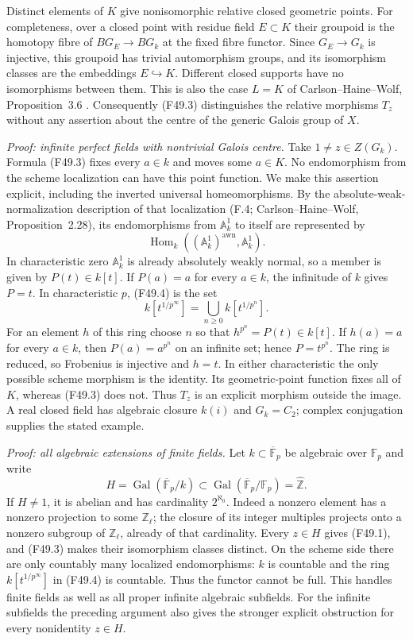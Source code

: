 Distinct elements of $K$ give nonisomorphic relative closed geometric
points. For completeness, over a closed point with residue field
$E\subset K$ their groupoid is the homotopy fibre of
$B G_E\to B G_k$ at the fixed fibre functor. Since $G_E\to G_k$
is injective, this groupoid has trivial automorphism groups, and its
isomorphism classes are the embeddings $E\hookrightarrow K$.
Different closed supports have no isomorphisms between them.
This is also the case $L=K$ of Carlson--Haine--Wolf,
Proposition~3.6 \citep{CHW2024}. Consequently (F49.3) distinguishes
the relative morphisms $T_z$ without any assertion about the centre
of the generic Galois group of $X$.

\emph{Proof: infinite perfect fields with nontrivial Galois centre.}
Take $1\ne z\in Z(G_k)$. Formula (F49.3) fixes every $a\in k$
and moves some $a\in K$. No endomorphism from the scheme
localization can have this point function. We make this assertion
explicit, including the inverted universal homeomorphisms.
By the absolute-weak-normalization description of that localization
(F.4; Carlson--Haine--Wolf, Proposition~2.28), its endomorphisms
from $\mathbb A^1_k$ to itself are represented by
\[
 \operatorname{Hom}_k((\mathbb A^1_k)^{\mathrm{awn}},\mathbb A^1_k).
                                                               \tag{F49.4}
\]
In characteristic zero $\mathbb A^1_k$ is already absolutely weakly
normal, so a member is given by $P(t)\in k[t]$. If $P(a)=a$ for
every $a\in k$, the infinitude of $k$ gives $P=t$.
In characteristic $p$, (F49.4) is the set
\[
                  k[t^{1/p^\infty}]
                    =\bigcup_{n\geq0}k[t^{1/p^n}].
\]
For an element $h$ of this ring choose $n$ so that
$h^{p^n}=P(t)\in k[t]$. If $h(a)=a$ for every $a\in k$, then
$P(a)=a^{p^n}$ on an infinite set; hence $P=t^{p^n}$.
The ring is reduced, so Frobenius is injective and $h=t$.
In either characteristic the only possible scheme morphism is the
identity. Its geometric-point function fixes all of $K$, whereas
(F49.3) does not. Thus $T_z$ is an explicit morphism outside the
image. A real closed field has algebraic closure $k(i)$ and
$G_k=C_2$; complex conjugation supplies the stated example.

\emph{Proof: all algebraic extensions of finite fields.}
Let $k\subset\overline{\mathbb F}_p$ be algebraic over
$\mathbb F_p$ and write
\[
 H=\operatorname{Gal}(\overline{\mathbb F}_p/k)
       \subset\operatorname{Gal}(\overline{\mathbb F}_p/\mathbb F_p)
       =\widehat{\mathbb Z}.
\]
If $H\ne1$, it is abelian and has cardinality $2^{\aleph_0}$.
Indeed a nonzero element has a nonzero projection to some
$\mathbb Z_\ell$; the closure of its integer multiples projects
onto a nonzero subgroup of $\mathbb Z_\ell$, already of that
cardinality. Every $z\in H$ gives (F49.1), and (F49.3) makes
their isomorphism classes distinct. On the scheme side there are
only countably many localized endomorphisms: $k$ is countable and
the ring $k[t^{1/p^\infty}]$ in (F49.4) is countable. Thus the
functor cannot be full. This handles finite fields as well as all
proper infinite algebraic subfields. For the infinite subfields the
preceding argument also gives the stronger explicit obstruction for
every nonidentity $z\in H$.


